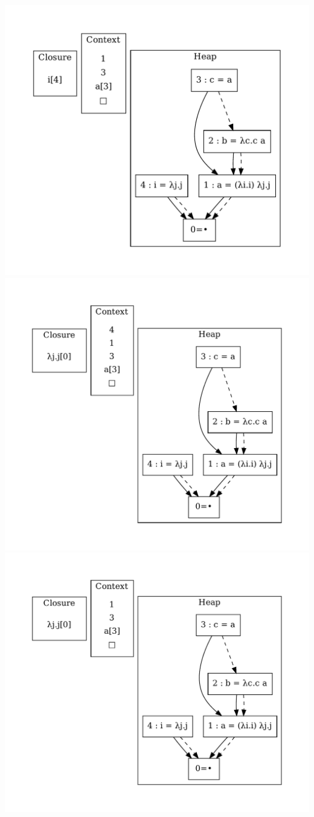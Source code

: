 \includegraphics[width=\linewidth/2]{figures/14.pdf}
\includegraphics[width=\linewidth/2]{figures/15.pdf}
\includegraphics[width=\linewidth/2]{figures/16.pdf}

